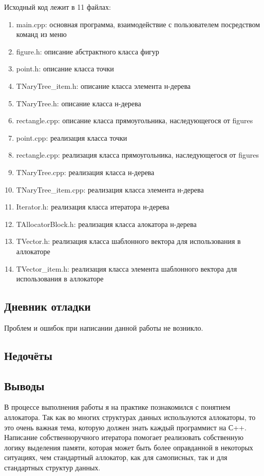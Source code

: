 \documentclass[12pt]{article}
\begin{document}
Исходный код лежит в 11 файлах:
\begin{enumerate}
\item main.cpp: основная программа, взаимодействие с пользователем посредством команд из меню
\item figure.h:    описание абстрактного класса фигур
\item point.h:     описание класса точки
\item TNaryTree\_item.h:  описание класса элемента н-дерева
\item TNaryTree.h: описание класса н-дерева
\item rectangle.cpp: описание класса прямоугольника, наследующегося от figures
\item point.cpp:     реализация класса точки
\item rectangle.cpp: реализация класса прямоугольника, наследующегося от figures
\item TNaryTree.cpp:  реализация класса н-дерева
\item TNaryTree\_item.cpp:  реализация класса элемента н-дерева
\item Iterator.h:  реализация класса итератора н-дерева
\item TAllocatorBlock.h:  реализация класса алокатора н-дерева
\item TVector.h:  реализация класса шаблонного вектора для использования в аллокаторе
\item TVector\_item.h:  реализация класса элемента шаблонного вектора для использования в аллокаторе

\end{enumerate}
\pagebreak
\subsection*{Дневник отладки}
Проблем и ошибок при написании данной работы не возникло.

\subsection*{Недочёты}


\subsection*{Выводы}
В процессе выполнения работы я на практике познакомился с понятием аллокатора. Так как во многих структурах данных используются аллокаторы, то это очень важная тема, которую должен знать каждый программист на С++. Написание собственноручного итератора помогает реализовать собственную логику выделения памяти, которая может быть более оправданной в некоторых ситуациях, чем стандартный аллокатор, как для самописных, так и для стандартных структур данных.
\end{document}
